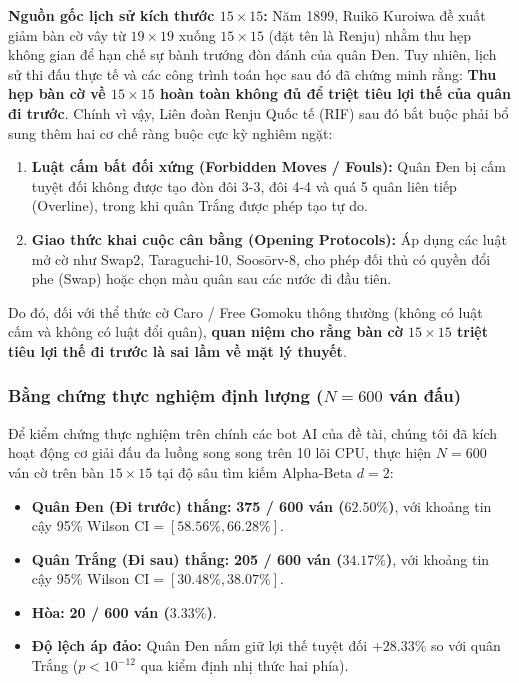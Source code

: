 \documentclass[11pt,a4paper]{article}
\begin{document}
\textbf{Nguồn gốc lịch sử kích thước $15 \times 15$:} Năm 1899, Ruikō Kuroiwa đề xuất giảm bàn cờ vây từ $19 \times 19$ xuống $15 \times 15$ (đặt tên là Renju) nhằm thu hẹp không gian để hạn chế sự bành trướng đòn đánh của quân Đen. Tuy nhiên, lịch sử thi đấu thực tế và các công trình toán học sau đó đã chứng minh rằng: \textbf{Thu hẹp bàn cờ về $15 \times 15$ hoàn toàn không đủ để triệt tiêu lợi thế của quân đi trước}. Chính vì vậy, Liên đoàn Renju Quốc tế (RIF) sau đó bắt buộc phải bổ sung thêm hai cơ chế ràng buộc cực kỳ nghiêm ngặt:
\begin{enumerate}
    \item \textbf{Luật cấm bất đối xứng (Forbidden Moves / Fouls):} Quân Đen bị cấm tuyệt đối không được tạo đòn đôi 3-3, đôi 4-4 và quá 5 quân liên tiếp (Overline), trong khi quân Trắng được phép tạo tự do.
    \item \textbf{Giao thức khai cuộc cân bằng (Opening Protocols):} Áp dụng các luật mở cờ như Swap2, Taraguchi-10, Soosōrv-8, cho phép đối thủ có quyền đổi phe (Swap) hoặc chọn màu quân sau các nước đi đầu tiên.
\end{enumerate}
Do đó, đối với thể thức cờ Caro / Free Gomoku thông thường (không có luật cấm và không có luật đổi quân), \textbf{quan niệm cho rằng bàn cờ $15 \times 15$ triệt tiêu lợi thế đi trước là sai lầm về mặt lý thuyết}.

\subsubsection{Bằng chứng thực nghiệm định lượng (\texorpdfstring{$N = 600$}{N = 600} ván đấu)}
Để kiểm chứng thực nghiệm trên chính các bot AI của đề tài, chúng tôi đã kích hoạt động cơ giải đấu đa luồng song song trên 10 lõi CPU, thực hiện $N = 600$ ván cờ trên bàn $15 \times 15$ tại độ sâu tìm kiếm Alpha-Beta $d = 2$:
\begin{itemize}
    \item \textbf{Quân Đen (Đi trước) thắng:} \textbf{375 / 600 ván ($62.50\%$)}, với khoảng tin cậy 95\% Wilson $\text{CI} = [58.56\%, 66.28\%]$.
    \item \textbf{Quân Trắng (Đi sau) thắng:} \textbf{205 / 600 ván ($34.17\%$)}, với khoảng tin cậy 95\% Wilson $\text{CI} = [30.48\%, 38.07\%]$.
    \item \textbf{Hòa:} \textbf{20 / 600 ván ($3.33\%$)}.
    \item \textbf{Độ lệch áp đảo:} Quân Đen nắm giữ lợi thế tuyệt đối \textbf{$+28.33\%$} so với quân Trắng ($p < 10^{-12}$ qua kiểm định nhị thức hai phía).
\end{itemize}
\end{document}
